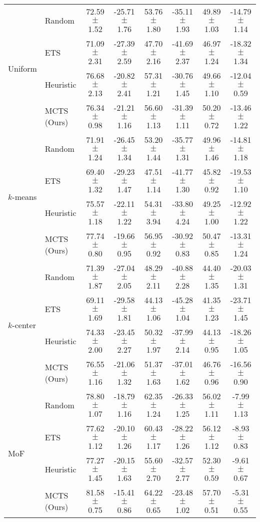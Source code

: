 \begin{tabular}{llcccccc}
	\multirow{4}{*}{Uniform}  & Random  & 72.59 $\pm$ 1.52  & -25.71 $\pm$ 1.76  & 53.76 $\pm$ 1.80   & -35.11 $\pm$ 1.93  & 49.89 $\pm$ 1.03    & -14.79 $\pm$ 1.14    \\
	& ETS     & 71.09 $\pm$ 2.31  & -27.39 $\pm$ 2.59  & 47.70 $\pm$ 2.16   & -41.69 $\pm$ 2.37  & 46.97 $\pm$ 1.24    & -18.32 $\pm$ 1.34    \\
	& Heuristic & 76.68 $\pm$ 2.13  & -20.82 $\pm$ 2.41  & 57.31 $\pm$ 1.21   & -30.76 $\pm$ 1.45  & 49.66 $\pm$ 1.10    & -12.04 $\pm$ 0.59    \\
	& MCTS (Ours)    & 76.34 $\pm$ 0.98  & -21.21 $\pm$ 1.16  & 56.60 $\pm$ 1.13   & -31.39 $\pm$ 1.11  & 50.20 $\pm$ 0.72    & -13.46 $\pm$ 1.22    \\ \midrule 
	\multirow{4}{*}{$k$-means}  & Random  & 71.91 $\pm$ 1.24  & -26.45 $\pm$ 1.34  & 53.20 $\pm$ 1.44   & -35.77 $\pm$ 1.31  & 49.96 $\pm$ 1.46    & -14.81 $\pm$ 1.18    \\
	& ETS     & 69.40 $\pm$ 1.32  & -29.23 $\pm$ 1.47  & 47.51 $\pm$ 1.14   & -41.77 $\pm$ 1.30  & 45.82 $\pm$ 0.92    & -19.53 $\pm$ 1.10    \\
	& Heuristic & 75.57 $\pm$ 1.18  & -22.11 $\pm$ 1.22  & 54.31 $\pm$ 3.94   & -33.80 $\pm$ 4.24  & 49.25 $\pm$ 1.00    & -12.92 $\pm$ 1.22    \\
	& MCTS (Ours)    & 77.74 $\pm$ 0.80  & -19.66 $\pm$ 0.95  & 56.95 $\pm$ 0.92   & -30.92 $\pm$ 0.83  & 50.47 $\pm$ 0.85    & -13.31 $\pm$ 1.24    \\ \midrule 
	\multirow{4}{*}{$k$-center} & Random  & 71.39 $\pm$ 1.87  & -27.04 $\pm$ 2.05  & 48.29 $\pm$ 2.11   & -40.88 $\pm$ 2.28  & 44.40 $\pm$ 1.35    & -20.03 $\pm$ 1.31    \\
	& ETS     & 69.11 $\pm$ 1.69  & -29.58 $\pm$ 1.81  & 44.13 $\pm$ 1.06   & -45.28 $\pm$ 1.04  & 41.35 $\pm$ 1.23    & -23.71 $\pm$ 1.45    \\
	& Heuristic & 74.33 $\pm$ 2.00  & -23.45 $\pm$ 2.27  & 50.32 $\pm$ 1.97   & -37.99 $\pm$ 2.14  & 44.13 $\pm$ 0.95    & -18.26 $\pm$ 1.05    \\
	& MCTS (Ours)    & 76.55 $\pm$ 1.16  & -21.06 $\pm$ 1.32  & 51.37 $\pm$ 1.63   & -37.01 $\pm$ 1.62  & 46.76 $\pm$ 0.96    & -16.56 $\pm$ 0.90    \\ \midrule 
	\multirow{4}{*}{MoF}      & Random  & 78.80 $\pm$ 1.07  & -18.79 $\pm$ 1.16  & 62.35 $\pm$ 1.24   & -26.33 $\pm$ 1.25  & 56.02 $\pm$ 1.11    & -7.99 $\pm$ 1.13     \\
	& ETS     & 77.62 $\pm$ 1.12  & -20.10 $\pm$ 1.26  & 60.43 $\pm$ 1.17   & -28.22 $\pm$ 1.26  & 56.12 $\pm$ 1.12    & -8.93 $\pm$ 0.83     \\
	& Heuristic & 77.27 $\pm$ 1.45  & -20.15 $\pm$ 1.63  & 55.60 $\pm$ 2.70   & -32.57 $\pm$ 2.77  & 52.30 $\pm$ 0.59    & -9.61 $\pm$ 0.67     \\
	& MCTS (Ours)    & 81.58 $\pm$ 0.75  & -15.41 $\pm$ 0.86  & 64.22 $\pm$ 0.65   & -23.48 $\pm$ 1.02  & 57.70 $\pm$ 0.51    & -5.31 $\pm$ 0.55    \\
	\bottomrule
\end{tabular}